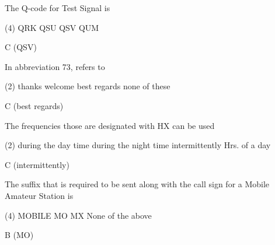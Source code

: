 \documentclass[a4paper]{article}
\begin{document}
\begin{question}The Q-code for Test Signal is \spaces
	\begin{tasks}(4)
		\task QRK
		\task QSU
		\task QSV
		\task QUM
	\end{tasks}
\end{question}

\begin{solution}
	C (QSV)
\end{solution}

\vspace{5mm}



\begin{question}In abbreviation 73, refers to \spaces
	\begin{tasks}(2)
		\task thanks
		\task welcome
		\task best regards
		\task none of these
	\end{tasks}
\end{question}

\begin{solution}
	C (best regards)
\end{solution}

\vspace{5mm}



\begin{question}The frequencies those are designated with \apostrophe{}HX\apostrophe{} can be used \spaces
	\begin{tasks}(2)
		\task during the day time
		\task during the night time
		\task intermittently
		 Hrs. of a day
	\end{tasks}
\end{question}

\begin{solution}
	C (intermittently)
\end{solution}

\vspace{5mm}



\begin{question}The suffix that is required to be sent along with the call sign for a Mobile Amateur Station is \spaces
	\begin{tasks}(4)
		\task MOBILE
		\task MO
		\task MX
		\task None of the above
	\end{tasks}
\end{question}

\begin{solution}
	B (MO)
\end{solution}
\end{document}
